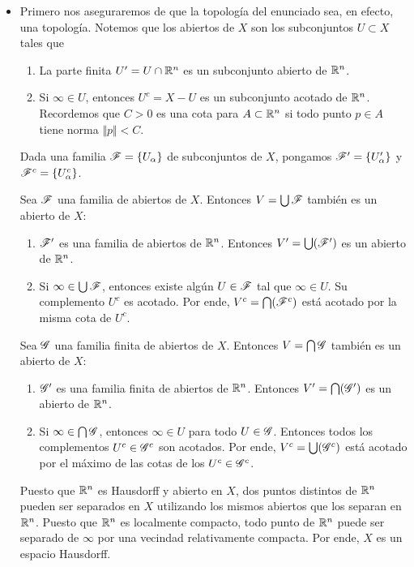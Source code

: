 \begin{solution}
\leavevmode
\begin{itemize}
    \item Primero nos aseguraremos de que la topología del enunciado sea, en efecto, una topología. Notemos que los abiertos de $X$ son los subconjuntos $U \subset X$ tales que
    \begin{enumerate}[label=\alph*)]
        \item La parte finita $U' = U \cap \mathbb R^n$ es un subconjunto abierto de $\mathbb R^n$.
        \item Si $\infty \in U$, entonces $U^c = X - U$ es un subconjunto acotado de $\mathbb R^n$. Recordemos que $C > 0$ es una cota para $A \subset \mathbb R^n$ si todo punto $p \in A$ tiene norma $\Vert p \Vert < C$.
    \end{enumerate}
    
    Dada una familia $\mathscr F = \{ U_\alpha \}$ de subconjuntos de $X$, pongamos $\mathscr F' = \{ U_\alpha' \}$ y $\mathscr F^c = \{ U_\alpha^c \}$.
    
    Sea $\mathscr F$ una familia de abiertos de $X$. Entonces $V = \bigcup \mathscr F$ también es un abierto de $X$:
    \begin{enumerate}[label=\alph*)]
        \item $\mathscr F'$ es una familia de abiertos de $\mathbb R^n$. Entonces $V' = \bigcup (\mathscr F')$ es un abierto de $\mathbb R^n$.
        
        \item Si $\infty \in \bigcup \mathscr F$, entonces existe algún $U \in \mathscr F$ tal que $\infty \in U$. Su complemento $U^c$ es acotado. Por ende, $V^c = \bigcap (\mathscr F^c)$ está acotado por la misma cota de $U^c$.
    \end{enumerate}
    
    Sea $\mathscr G$ una familia finita de abiertos de $X$. Entonces $V = \bigcap \mathscr G$ también es un abierto de $X$:
    \begin{enumerate}[label=\alph*)]
        \item $\mathscr G'$ es una familia finita de abiertos de $\mathbb R^n$. Entonces $V' = \bigcap (\mathscr G')$ es un abierto de $\mathbb R^n$.
        
        \item Si $\infty \in \bigcap \mathscr G$, entonces $\infty \in U$ para todo $U \in \mathscr G$. Entonces todos los complementos $U^c \in \mathscr G^c$ son acotados. Por ende, $V^c = \bigcup (\mathscr G^c)$ está acotado por el máximo de las cotas de los $U^c \in \mathscr G^c$.
    \end{enumerate}
    
    Puesto que $\mathbb R^n$ es Hausdorff y abierto en $X$, dos puntos distintos de $\mathbb R^n$ pueden ser separados en $X$ utilizando los mismos abiertos que los separan en $\mathbb R^n$. Puesto que $\mathbb R^n$ es localmente compacto, todo punto de $\mathbb R^n$ puede ser separado de $\infty$ por una vecindad relativamente compacta. Por ende, $X$ es un espacio Hausdorff.
    

\end{itemize}
\end{solution}
